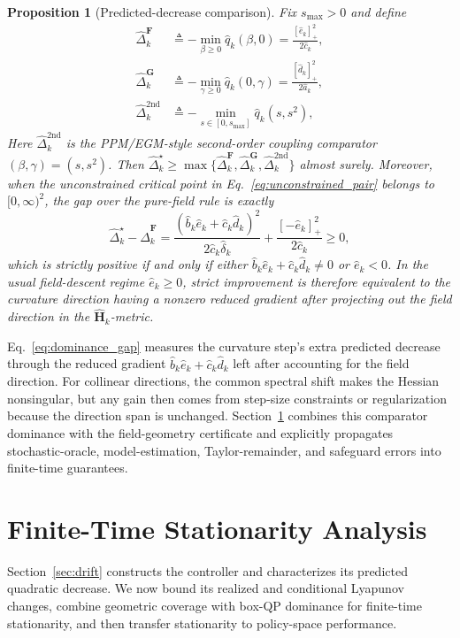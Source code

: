 \documentclass{article}
\newtheorem{proposition}{Proposition}
\theoremstyle{remark}
\newcommand{\bH}{\boldsymbol{H}}
\newcommand{\bF}{\boldsymbol{F}}
\newcommand{\bG}{\boldsymbol{G}}
\begin{document}
\begin{proposition}[Predicted-decrease comparison]\label{prop:dominance}
Fix $s_{\max}>0$ and define
\begin{align*}
\widehat\Delta_{k}^{\bF}
&\triangleq
-\min_{\beta\ge 0}\hat q_{k}(\beta,0)
=
\tfrac{[\hat e_{k}]_{+}^{2}}{2\hat c_{k}},\\
\widehat\Delta_{k}^{\bG}
&\triangleq
-\min_{\gamma\ge 0}\hat q_{k}(0,\gamma)
=
\tfrac{[\hat d_{k}]_{+}^{2}}{2\hat a_{k}},\\
\widehat\Delta_{k}^{\mathrm{2nd}}
&\triangleq
-\min_{s\in[0,s_{\max}]}\hat q_{k}(s,s^{2}),
\end{align*}
Here $\widehat\Delta_k^{\mathrm{2nd}}$ is the PPM/EGM-style second-order coupling comparator $(\beta,\gamma)=(s,s^2)$.
Then $\widehat\Delta_{k}^{\star}\ge\max\{\widehat\Delta_{k}^{\bF},\widehat\Delta_{k}^{\bG},\widehat\Delta_{k}^{\mathrm{2nd}}\}$ almost surely.
Moreover, when the unconstrained critical point in Eq.~\eqref{eq:unconstrained_pair} belongs to $[0,\infty)^2$, the gap over the pure-field rule is exactly
\begin{equation}\label{eq:dominance_gap}
\widehat\Delta_{k}^{\star}-\widehat\Delta_{k}^{\bF}
=
\frac{(\hat b_{k}\hat e_{k}+\hat c_{k}\hat d_{k})^{2}}{2\hat c_{k}\hat\delta_{k}}
+\frac{[-\hat e_k]_{+}^{2}}{2\hat c_k}
\ge 0,
\end{equation}
which is strictly positive if and only if either $\hat b_{k}\hat e_{k}+\hat c_{k}\hat d_{k}\neq 0$ or $\hat e_k<0$.
In the usual field-descent regime $\hat e_k\ge0$, strict improvement is therefore equivalent to the curvature direction having a nonzero reduced gradient after projecting out the field direction in the $\widehat{\bH}_{k}$-metric.
\end{proposition}

Eq.~\eqref{eq:dominance_gap} measures the curvature step's extra predicted decrease through the reduced gradient $\hat b_k\hat e_k+\hat c_k\hat d_k$ left after accounting for the field direction.
For collinear directions, the common spectral shift makes the Hessian nonsingular, but any gain then comes from step-size constraints or regularization because the direction span is unchanged.
Section~\ref{sec:conv} combines this comparator dominance with the field-geometry certificate and explicitly propagates stochastic-oracle, model-estimation, Taylor-remainder, and safeguard errors into finite-time guarantees.

\section{Finite-Time Stationarity Analysis}\label{sec:conv}
Section~\ref{sec:drift} constructs the controller and characterizes its predicted quadratic decrease.
We now bound its realized and conditional Lyapunov changes, combine geometric coverage with box-QP dominance for finite-time stationarity, and then transfer stationarity to policy-space performance.
\end{document}
